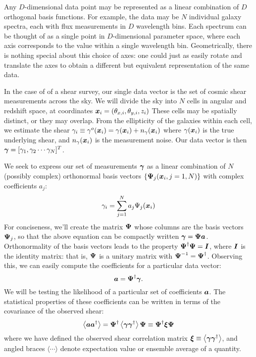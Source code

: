 Any $D$-dimensional data point may be represented as a linear combination of 
$D$ orthogonal basis functions.  
For example, the data may be $N$ individual galaxy spectra, each with flux
measurements in $D$ wavelength bins.  Each spectrum can be thought of as a
single point in $D$-dimensional parameter space, where each axis corresponds
to the value within a single wavelength bin.  
Geometrically, there is nothing special about
this choice of axes: one could just as easily rotate and translate the axes
to obtain a different but equivalent representation of the same data.

In the case of of a shear survey, our single data vector is the set of
cosmic shear measurements across the sky.  We will divide the sky into $N$
cells in angular and redshift space, at coordinates
$\boldsymbol{x}_i = (\theta_{x,i}, \theta_{y,i}, z_i)$
These cells may be spatially distinct, or they may overlap.
From the ellipticity of the galaxies within each cell, we
estimate the shear
$\gamma_i \equiv \gamma^o(\boldsymbol{x}_i) = 
\gamma(\boldsymbol{x}_i) + n_\gamma(\boldsymbol{x}_i)$
where $\gamma(\boldsymbol{x}_i)$ is the true underlying shear,
and $n_\gamma(\boldsymbol{x}_i)$ is the measurement noise.
Our data vector is then
$\boldsymbol{\gamma} = [\gamma_1, \gamma_2 \cdots \gamma_N]^T$.

We seek to express our set of measurements $\boldsymbol{\gamma}$
as a linear combination of $N$ (possibly complex) 
orthonormal basis vectors
$\{\boldsymbol{\Psi}_j(\boldsymbol{x}_i, j=1,N)\}$ with complex coefficients
$a_j$:
\begin{equation}
  \label{eq:gamma_decomp}
  \gamma_i = \sum_{j=1}^{N} a_j \Psi_j(\boldsymbol{x}_i)
\end{equation}
For conciseness, we'll create the matrix $\boldsymbol{\Psi}$ whose columns are
the basis vectors $\boldsymbol{\Psi}_j$, so that the above equation can be
compactly written $\boldsymbol{\gamma} = \boldsymbol{\Psi}\boldsymbol{a}$.  Orthonormality
of the basis vectors leads to the property
$\boldsymbol{\Psi}^\dagger\boldsymbol{\Psi} = \boldsymbol{I}$, where $\boldsymbol{I}$ is the identity
matrix: that is, $\boldsymbol{\Psi}$ is a unitary matrix with
$\boldsymbol{\Psi}^{-1} = \boldsymbol{\Psi}^\dagger$.  Observing this, we can easily compute
the coefficients for a particular data vector:
\begin{equation}
  \boldsymbol{a} = \boldsymbol{\Psi}^\dagger \boldsymbol{\gamma}.
\end{equation}
We will be testing the likelihood of a particular set of coefficients
$\boldsymbol{a}$.  
The statistical properties of these coefficients can be written in terms of
the covariance of the observed shear:
\begin{equation}
  \label{eq:a_cov}
  \left\langle \boldsymbol{a}\boldsymbol{a}^\dagger \right\rangle 
  =  \boldsymbol{\Psi}^\dagger
  \left\langle \boldsymbol{\gamma}\boldsymbol{\gamma}^\dagger \right\rangle 
  \boldsymbol{\Psi}
  \equiv \boldsymbol{\Psi}^\dagger \boldsymbol{\xi}  \boldsymbol{\Psi}
\end{equation}
where we have defined the observed shear correlation matrix 
$\boldsymbol{\xi} \equiv \left\langle 
\boldsymbol{\gamma}\boldsymbol{\gamma}^\dagger \right\rangle$, and angled braces
$\langle\cdots\rangle$ denote expectation value or ensemble average
of a quantity.


